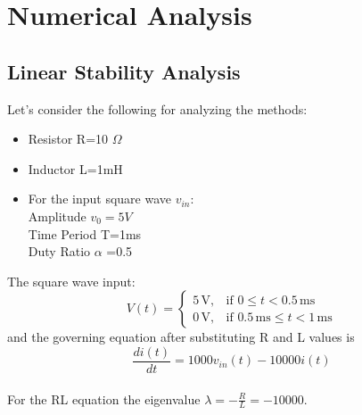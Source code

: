 
\chapter{Numerical Analysis} %

\label{Chapter3} %


\section{Linear Stability Analysis}
Let's consider the following for analyzing the methods:
    \begin{itemize}
        \item Resistor R=10 $\Omega$
        \item Inductor L=1mH
        \item For the input square wave $v_{in}$:\\
        Amplitude $v_{0}=5V$\\
        Time Period T=1ms\\
        Duty Ratio $\alpha$ =0.5
    \end{itemize}
    The square wave input:\\
    \[
        V(t) =
        \begin{cases}
        5 \, \text{V}, & \text{if } 0 \leq t < 0.5 \, \text{ms} \\
        0 \, \text{V}, & \text{if } 0.5 \, \text{ms} \leq t < 1 \, \text{ms}
        \end{cases}
    \]
    and the governing equation after substituting R and L values is \[\frac{di(t)}{dt}=1000v_{in}(t)-10000i(t)\]\\
    For the RL equation the eigenvalue $\lambda=-\frac{R}{L}=-10000$.\\
